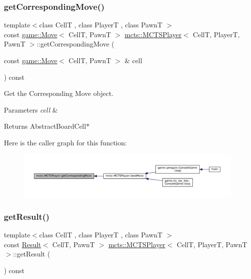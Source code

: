 \subsubsection{\texorpdfstring{get\+Corresponding\+Move()}{getCorrespondingMove()}}
{\footnotesize\ttfamily template$<$class CellT , class PlayerT , class PawnT $>$ \\
const \hyperlink{structgame_1_1_move}{game\+::\+Move}$<$ CellT, PawnT $>$ \hyperlink{classmcts_1_1_m_c_t_s_player}{mcts\+::\+M\+C\+T\+S\+Player}$<$ CellT, PlayerT, PawnT $>$\+::get\+Corresponding\+Move (\begin{DoxyParamCaption}\item[{const \hyperlink{structgame_1_1_move}{game\+::\+Move}$<$ CellT, PawnT $>$ \&}]{cell }\end{DoxyParamCaption}) const\hspace{0.3cm}{\ttfamily [protected]}}



Get the Corresponding Move object. 


\begin{DoxyParams}{Parameters}
{\em cell} & \\
\hline
\end{DoxyParams}
\begin{DoxyReturn}{Returns}
Abstract\+Board\+Cell$\ast$ 
\end{DoxyReturn}
Here is the caller graph for this function\+:
\nopagebreak
\begin{figure}[H]
\begin{center}
\leavevmode
\includegraphics[width=350pt]{classmcts_1_1_m_c_t_s_player_aa68be6bbbbd01044d42b9c2d0149b366_icgraph}
\end{center}
\end{figure}
\mbox{\label{classmcts_1_1_m_c_t_s_player_a7d307a84ff2225af4ae34b100f91275a}} 
\subsubsection{\texorpdfstring{get\+Result()}{getResult()}}
{\footnotesize\ttfamily template$<$class CellT , class PlayerT , class PawnT $>$ \\
const \hyperlink{structmcts_1_1_result}{Result}$<$ CellT, PawnT $>$ \hyperlink{classmcts_1_1_m_c_t_s_player}{mcts\+::\+M\+C\+T\+S\+Player}$<$ CellT, PlayerT, PawnT $>$\+::get\+Result (\begin{DoxyParamCaption}{ }\end{DoxyParamCaption}) const}

